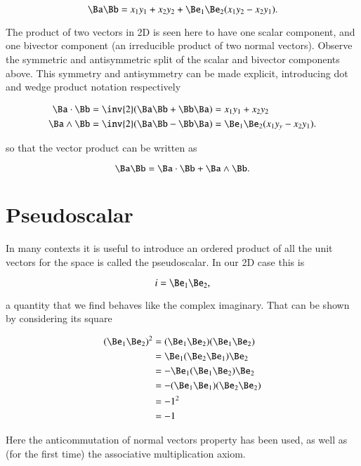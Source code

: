 \begin{equation}\label{eqn:gaQuickIntro:30b}
\Ba \Bb = x_1 y_1 + x_2 y_2 + \Be_1 \Be_2 (x_1 y_2 - x_2 y_1).
\end{equation}

The product of two vectors in 2D is seen here to have one scalar component, and one bivector component (an irreducible product of two normal vectors).  Observe the symmetric and antisymmetric split of the scalar and bivector components above.  This symmetry and antisymmetry can be made explicit, introducing dot and wedge product notation respectively

\begin{align}\label{eqn:gaQuickIntro:90}
\Ba \cdot \Bb &= \inv{2}( \Ba \Bb + \Bb \Ba) = x_1 y_1 + x_2 y_2 \\
\Ba \wedge \Bb &= \inv{2}( \Ba \Bb - \Bb \Ba) = \Be_1 \Be_2 (x_1 y_y - x_2 y_1).
\end{align}

so that the vector product can be written as

\begin{equation}\label{eqn:gaQuickIntro:110}
\Ba \Bb = \Ba \cdot \Bb + \Ba \wedge \Bb.
\end{equation}

\section{Pseudoscalar}

In many contexts it is useful to introduce an ordered product of all the unit vectors for the space is called the pseudoscalar.  In our 2D case this is

\begin{equation}\label{eqn:gaQuickIntro:130}
i = \Be_1 \Be_2,
\end{equation}

a quantity that we find behaves like the complex imaginary.  That can be shown by considering its square

\begin{align*}
(\Be_1 \Be_2)^2
&=
(\Be_1 \Be_2)
(\Be_1 \Be_2) \\
&=
\Be_1 (\Be_2 \Be_1) \Be_2 \\
&=
-\Be_1 (\Be_1 \Be_2) \Be_2 \\
&=
-(\Be_1 \Be_1) (\Be_2 \Be_2) \\
&=
-1^2 \\
&= -1
\end{align*}

Here the anticommutation of normal vectors property has been used, as well as (for the first time) the associative multiplication axiom.

